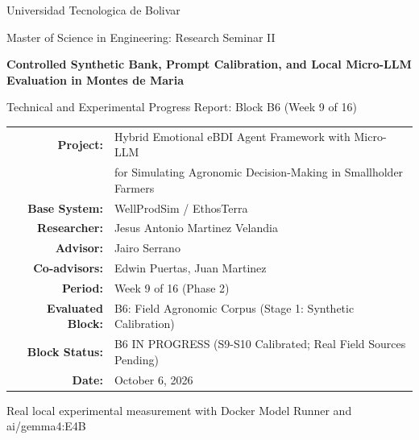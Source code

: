\documentclass[11pt,a4paper]{article}
\begin{document}
\begin{titlepage}
    \centering
    \vspace*{1.2cm}

    {\large Universidad Tecnologica de Bolivar\par}
    \vspace{0.3cm}
    {\normalsize Master of Science in Engineering: Research Seminar II\par}

    \vspace{2.0cm}
    {\LARGE\bfseries Controlled Synthetic Bank, Prompt Calibration, and Local Micro-LLM Evaluation in Montes de Maria\par}
    \vspace{0.5cm}
    {\large Technical and Experimental Progress Report: Block B6 (Week 9 of 16)\par}

    \vspace{2.0cm}
    \begin{tabular}{rl}
        \textbf{Project:} & Hybrid Emotional eBDI Agent Framework with Micro-LLM \\
                           & for Simulating Agronomic Decision-Making in Smallholder Farmers \\
        \textbf{Base System:} & WellProdSim / EthosTerra \\
        \textbf{Researcher:} & Jesus Antonio Martinez Velandia \\
        \textbf{Advisor:} & Jairo Serrano \\
        \textbf{Co-advisors:} & Edwin Puertas, Juan Martinez \\
        \textbf{Period:} & Week 9 of 16 (Phase 2) \\
        \textbf{Evaluated Block:} & B6: Field Agronomic Corpus (Stage 1: Synthetic Calibration) \\
        \textbf{Block Status:} & B6 IN PROGRESS (S9-S10 Calibrated; Real Field Sources Pending) \\
        \textbf{Date:} & October 6, 2026 \\
    \end{tabular}

    \vfill
    {\small Real local experimental measurement with Docker Model Runner and ai/gemma4:E4B\par}
    \vspace*{0.8cm}
\end{titlepage}
\end{document}
